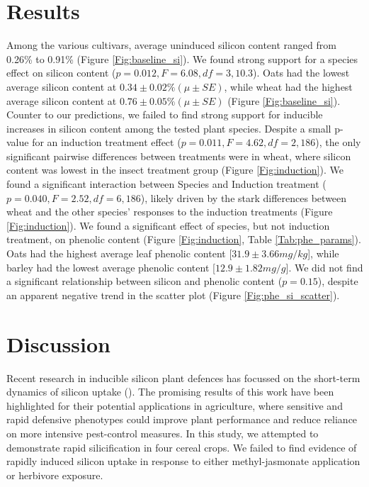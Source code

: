 \documentclass[12pt, letterpaper, ]{report}
\begin{document}
\section{Results}
Among the various cultivars, average uninduced silicon content ranged from 0.26\% to 0.91\% (Figure \ref{Fig:baseline_si}). We found strong support for a species effect on silicon content ($p=0.012, F = 6.08, df=3,10.3$). Oats had the lowest average silicon content at $0.34 \pm 0.02\% (\mu \pm SE)$, while wheat had the highest average silicon content at $0.76 \pm 0.05\% (\mu \pm SE)$ (Figure \ref{Fig:baseline_si}). Counter to our predictions, we failed to find strong support for inducible increases in silicon content among the tested plant species. Despite a small p-value for an induction treatment effect ($p = 0.011, F = 4.62, df =2, 186$), the only significant pairwise differences between treatments were in wheat, where silicon content was lowest in the insect treatment group (Figure \ref{Fig:induction}). We found a significant interaction between Species and Induction treatment ($p = 0.040, F = 2.52, df = 6,186$), likely driven by the stark differences between wheat and the other species' responses to the induction treatments (Figure \ref{Fig:induction}).
We found a significant effect of species, but not induction treatment, on phenolic content (Figure \ref{Fig:induction}, Table \ref{Tab:phe_params}). Oats had the highest average leaf phenolic content [$31.9 \pm 3.66 mg/kg$], while barley had the lowest average phenolic content [$12.9 \pm 1.82 mg/g$]. 
We did not find a significant relationship between silicon and phenolic content ($p = 0.15$), despite an apparent negative trend in the scatter plot (Figure \ref{Fig:phe_si_scatter}).

\section{Discussion}

Recent research in inducible silicon plant defences has focussed on the short-term dynamics of silicon uptake (\cite{waterman_short-term_2021,waterman_short-term_2021-1}). The promising results of this work have been highlighted for their potential applications in agriculture, where sensitive and rapid defensive phenotypes could improve plant performance and reduce reliance on more intensive pest-control measures. In this study, we attempted to demonstrate rapid silicification in four cereal crops. We failed to find evidence of rapidly induced silicon uptake in response to either methyl-jasmonate application or herbivore exposure. 
\end{document}
